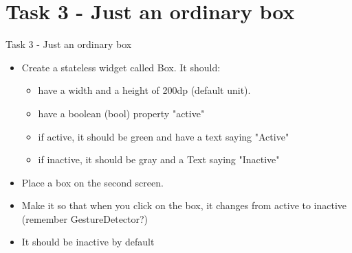 \section{Task 3 - Just an ordinary box}

\begin{frame}{Task 3 - Just an ordinary box}
    \begin{itemize}
        \item Create a stateless widget called Box. It should:
        \begin{itemize}
            \item have a width and a height of 200dp (default unit).
            \item have a boolean (bool) property "active"
            \item if active, it should be green and have a text saying "Active"
            \item if inactive, it should be gray and a Text saying "Inactive"
        \end{itemize}
        \item Place a box on the second screen.
        \item Make it so that when you click on the box, it changes from active to inactive (remember GestureDetector?)
        \item It should be inactive by default
    \end{itemize}
\end{frame}


